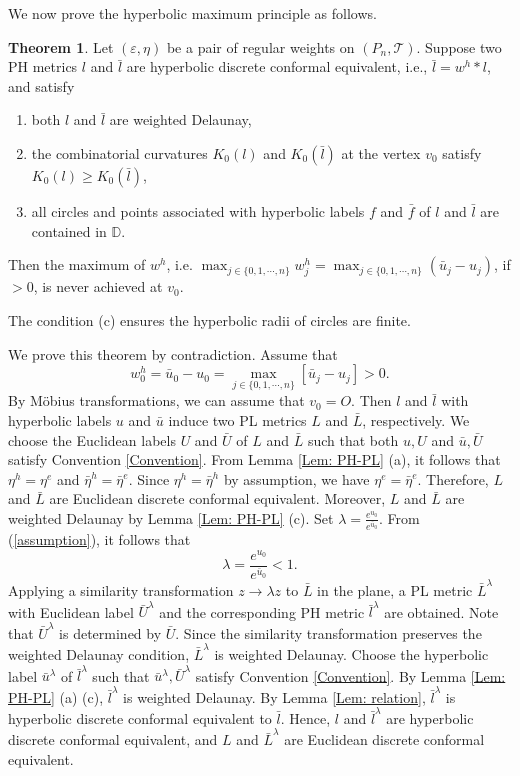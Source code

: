 \documentclass[12pt]{amsart}
\theoremstyle{definition}
\newtheorem{theorem}{Theorem}[section]
\begin{document}
We now prove the hyperbolic maximum principle as follows.
\begin{theorem}\label{Thm: MP-H2}
Let $(\varepsilon,\eta)$ be a  pair of regular weights on $(P_n,\mathcal{T})$.
Suppose two PH metrics $l$ and $\bar{l}$ are hyperbolic discrete conformal equivalent, i.e., $\bar{l}=w^h\ast l$, and satisfy
\begin{enumerate}
\item[(a)] both $l$ and $\bar{l}$ are weighted Delaunay,
\item[(b)] the combinatorial curvatures $K_0(l)$ and $K_0(\bar{l})$ at the vertex $v_0$ satisfy $K_0(l) \geq K_0(\bar{l})$,
\item[(c)] all circles and points associated with hyperbolic labels $f$ and $\bar{f}$ of $l$ and $\bar{l}$ are contained in $\mathbb{D}$.
\end{enumerate}
Then the maximum of $w^h$, i.e. $\max_{j\in \{0, 1, \cdots, n\}}w^h_j=\max_{j\in \{0, 1, \cdots, n\}}(\bar{u}_j-u_j)$, if $>0$, is never achieved at $v_0$.
\end{theorem}

The condition (c) ensures the hyperbolic radii of circles are finite. 

\proof
We prove this theorem by contradiction.
Assume that
\begin{equation}\label{assumption}
w^h_0=\bar{u}_0-u_0
=\max_{j\in \{0, 1, \cdots, n\}}[\bar{u}_j-u_j]>0.
\end{equation}
By M\"{o}bius transformations, we can assume that $v_0=O$.
Then $l$ and $\bar{l}$ with hyperbolic labels $u$ and $\bar{u}$ induce two PL metrics $L$ and $\bar{L}$, respectively.
We choose the Euclidean labels $U$ and $\bar{U}$ of $L$ and $\bar{L}$ such that both $u,U$ and $\bar{u},\bar{U}$ satisfy Convention \ref{Convention}.
From Lemma \ref{Lem: PH-PL} (a), it follows that $\eta^h=\eta^e$ and $\bar{\eta}^h=\bar{\eta}^e$.
Since $\eta^h=\bar{\eta}^h$ by assumption, we have $\eta^e=\bar{\eta}^e$.
Therefore, $L$ and $\bar{L}$ are Euclidean discrete conformal equivalent.
Moreover, $L$ and $\bar{L}$ are weighted Delaunay by Lemma \ref{Lem: PH-PL} (c).
Set $\lambda=\frac{e^{u_0}}{e^{\bar{u}_0}}$. 
From (\ref{assumption}), it follows that
\begin{equation}\label{Eq: F18}
\lambda=\frac{e^{u_0}}{e^{\bar{u}_0}}<1.
\end{equation}
Applying a similarity transformation $z \to \lambda z$ to $\bar{L}$ in the plane,
a PL metric $\bar{L}^\lambda$ with Euclidean label $\bar{U}^\lambda$ and the corresponding PH metric $\bar{l}^\lambda$ are obtained.
Note that $\bar{U}^\lambda$ is determined by $\bar{U}$.
Since the similarity transformation preserves the weighted Delaunay condition,
$\bar{L}^\lambda$ is weighted Delaunay.
Choose the hyperbolic label $\bar{u}^\lambda$ of $\bar{l}^\lambda$ such that $\bar{u}^\lambda,\bar{U}^\lambda$ satisfy Convention \ref{Convention}.
By Lemma \ref{Lem: PH-PL} (a) (c), $\bar{l}^{\lambda}$ is weighted Delaunay.
By Lemma \ref{Lem: relation}, $\bar{l}^{\lambda}$ is hyperbolic discrete conformal equivalent to $\bar{l}$.
Hence, $l$ and $\bar{l}^{\lambda}$ are hyperbolic discrete conformal equivalent, and $L$ and $\bar L^\lambda$ are Euclidean discrete conformal equivalent.
\end{document}
